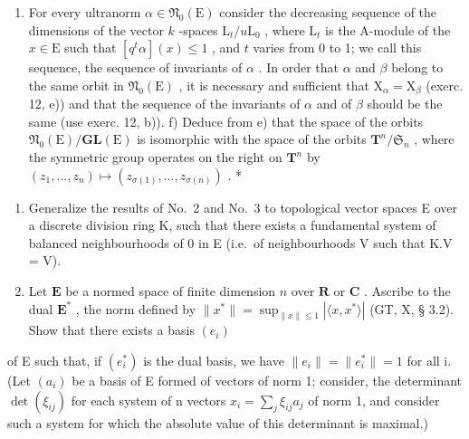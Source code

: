 \begin{enumerate}
\def\labelenumi{\alph{enumi})}
\setcounter{enumi}{4}
\tightlist
\item
  For every ultranorm \(\alpha \in \mathfrak{N}_0(\mathrm{E})\) consider the decreasing sequence of the dimensions of the vector \(k\) -spaces \(\mathrm{L}_t / u\mathrm{L}_0\) , where \(\mathrm{L}_t\) is the A-module of the \(x \in \mathrm{E}\) such that \([q^t\alpha](x) \leqslant 1\) , and \(t\) varies from 0 to 1; we call this sequence, the sequence of invariants of \(\alpha\) . In order that \(\alpha\) and \(\beta\) belong to the same orbit in \(\mathfrak{N}_0(\mathrm{E})\) , it is necessary and sufficient that \(\mathrm{X}_{\alpha} = \mathrm{X}_{\beta}\) (exerc. 12, e)) and that the sequence of the invariants of \(\alpha\) and of \(\beta\) should be the same (use exerc. 12, b)). f) Deduce from e) that the space of the orbits \(\mathfrak{N}_0(\mathrm{E}) / \mathbf{GL}(\mathrm{E})\) is isomorphic with the space of the orbits \(\mathbf{T}^n / \mathfrak{S}_n\) , where the symmetric group operates on the right on \(\mathbf{T}^n\) by \((z_1, ..., z_n) \mapsto (z_{\sigma(1)}, ..., z_{\sigma(n)})\) . *
\end{enumerate}

\begin{enumerate}
\def\labelenumi{\arabic{enumi})}
\setcounter{enumi}{13}
\item
  Generalize the results of No.~2 and No.~3 to topological vector spaces E over a discrete division ring K, such that there exists a fundamental system of balanced neighbourhoods of 0 in E (i.e.~of neighbourhoods V such that K.V = V).
\item
  Let \(\mathbf{E}\) be a normed space of finite dimension \(n\) over \(\mathbf{R}\) or \(\mathbf{C}\) . Ascribe to the dual \(\mathbf{E}^*\) , the norm defined by \(\| x^* \| = \sup_{\| x \| \leqslant 1} |\langle x, x^* \rangle|\) (GT, X, § 3.2). Show that there exists a basis \((e_i)\)
\end{enumerate}

of E such that, if \((e_{i}^{*})\) is the dual basis, we have \(\|e_{i}\| = \|e_{i}^{*}\| = 1\) for all i. (Let \((a_{i})\) be a basis of E formed of vectors of norm 1; consider, the determinant \(\det(\xi_{ij})\) for each system of n vectors \(x_{i} = \sum_{j} \xi_{ij} a_{j}\) of norm 1, and consider such a system for which the absolute value of this determinant is maximal.)

\exercisegroup


